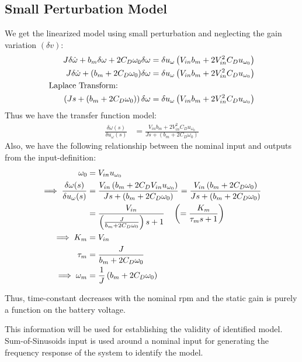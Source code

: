 \subsection{Small Perturbation Model}
We get the linearized model using small perturbation and neglecting the gain variation $(\delta v)$:
\begin{align*}
    J \delta \dot \omega + b_m \delta \omega + 2 C_D \omega_0 \delta \omega  &= \delta u_\omega \left( V_{in} b_m + 2V_{in}^2 C_D u_{\omega_0} \right)\\
    J \delta \dot \omega + (b_m + 2 C_D \omega_0) \delta \omega  &= \delta u_\omega \left( V_{in} b_m + 2V_{in}^2 C_D u_{\omega_0} \right)\\
    \text{Laplace Transform:} \qquad \qquad &\\
     \left( Js + (b_m + 2 C_D \omega_0) \right) \delta \omega  &= \delta u_\omega \left( V_{in} b_m + 2V_{in}^2 C_D u_{\omega_0} \right)
\end{align*}
Thus we have the transfer function model:
\begin{align*}
    \frac{\delta \omega(s)}{\delta u_\omega (s)} &= \frac{V_{in} b_m + 2V_{in}^2 C_D u_{\omega_0}}{Js + (b_m + 2 C_D \omega_0)}
\end{align*}
Also, we have the following relationship between the nominal input and outputs from the input-definition:
\begin{align*}
    \omega_0 &= V_{in} u_{\omega_0}\\
    \implies \frac{\delta \omega(s)}{\delta u_\omega (s)} &= \frac{V_{in} \left( b_m + 2C_D V_{in} u_{\omega_0} \right)}{Js + (b_m + 2 C_D \omega_0)}
    = \frac{V_{in} \left( b_m + 2C_D \omega_0 \right)}{Js + (b_m + 2 C_D \omega_0)}\\
    &= \frac{V_{in}}{ \left( \frac{J}{b_m + 2 C_D \omega_0} \right) s + 1} \quad \left( = \frac{K_m}{\tau_m s + 1} \right)\\
    \implies K_m &= V_{in}\\
    \tau_m &= \frac{J}{b_m + 2 C_D \omega_0}\\
    \implies \omega_m &= \frac{1}{J}\left( b_m + 2 C_D \omega_0 \right)
\end{align*}

Thus, time-constant decreases with the nominal rpm and the static gain is purely a function on the battery voltage.

This information will be used for establishing the validity of identified model. Sum-of-Sinusoids input is used around a nominal input for generating the frequency response of the system to identify the model.

